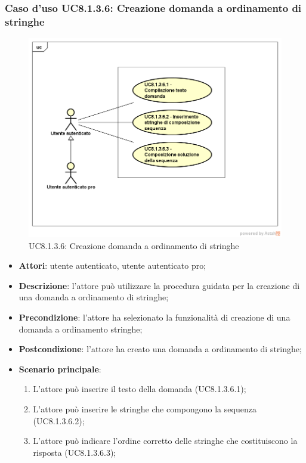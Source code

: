 \subsubsection{Caso d'uso UC8.1.3.6: Creazione domanda a ordinamento di stringhe}
	\label{UC8.1.3.6}
	\begin{figure}[h]
		\centering
			\includegraphics[scale=0.45,keepaspectratio]{UML/UC8_1_3_6.png}
		\caption{UC8.1.3.6: Creazione domanda a ordinamento di stringhe}
	\end{figure}
	\FloatBarrier
\begin{itemize}
	\item\textbf{Attori}: utente autenticato, utente autenticato pro;
	\item\textbf{Descrizione}: l'attore può utilizzare la procedura guidata per la creazione di una domanda a ordinamento di stringhe;
	\item \textbf{Precondizione}: l'attore ha selezionato la funzionalità di creazione di una domanda a ordinamento stringhe;
	\item\textbf{Postcondizione}: l'attore ha creato una domanda a ordinamento di stringhe;
	\item\textbf{Scenario principale}:
		\begin{enumerate}
			\item L'attore può inserire il testo della domanda (UC8.1.3.6.1);
			\item L'attore può inserire le stringhe che compongono la sequenza (UC8.1.3.6.2);
			\item L'attore può indicare l'ordine corretto delle stringhe che costituiscono la risposta (UC8.1.3.6.3);
		\end{enumerate}
\end{itemize}

